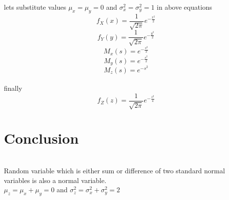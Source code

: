 \documentclass[journal,12pt,twocolumn]{IEEEtran}
\begin{document}
lets substitute values $\mu_x=\mu_y=0$ and $\sigma_x^2=\sigma_y^2=1$ in above equations
\begin{equation}
    f_X(x)=\frac{1}{\sqrt{2\pi}}e^{-\frac{x^2}{2}}
\end{equation}
\begin{equation}
    f_Y(y)=\frac{1}{\sqrt{2\pi}}e^{-\frac{y^2}{2}}
\end{equation}
\begin{equation}
    M_x(s)=e^{-\frac{s^2}{2}}
\end{equation}
\begin{equation}
    M_y(s)=e^{-\frac{s^2}{2}}
\end{equation}
\begin{equation}
    M_z(s)=e^{-s^2}
\end{equation}\\
finally
\begin{equation}
  f_Z(z)=\frac{1}{\sqrt{2\pi}}e^{-\frac{z^2}{4}}
\end{equation}

\section{Conclusion}\\
Random variable which is either sum or difference of two standard normal variables is also a normal variable.\\
$ \mu_z=\mu_x+\mu_y=0$ and $\sigma_z^2=\sigma_x^2+\sigma_y^2=2$
\end{document}
